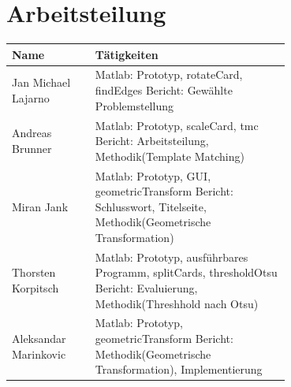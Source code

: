 \documentclass[paper=A4, deutsch]{scrartcl}
\begin{document}
\section{Arbeitsteilung}
\begin{center}
  \begin{tabular}{ |l |p{0.7\linewidth} | }
    \hline
  Name & Tätigkeiten\\
    \hline
		Jan Michael Lajarno & Matlab: Prototyp, rotateCard, findEdges \newline Bericht: Gewählte Problemstellung\\
		\hline
		Andreas Brunner & Matlab: Prototyp, scaleCard, tmc \newline Bericht: Arbeitsteilung, Methodik(Template Matching)\\
		\hline
		Miran Jank & Matlab: Prototyp, GUI, geometricTransform \newline Bericht: Schlusswort, Titelseite, Methodik(Geometrische Transformation)\\
		\hline
		Thorsten Korpitsch & Matlab: Prototyp, ausführbares Programm, splitCards, thresholdOtsu \newline Bericht: Evaluierung, Methodik(Threshhold nach Otsu)\\
		\hline
		Aleksandar Marinkovic & Matlab: Prototyp, geometricTransform \newline Bericht: Methodik(Geometrische Transformation), Implementierung\\ 
		\hline
  \end{tabular}
\end{center}


\end{document}
